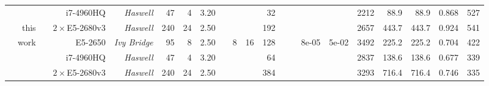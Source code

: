 \begin{table}
\begin{adjustbox}{angle=90}
{{\begin{tabular}{|r|r|r||r|r|r|r|r|r|r|r|r|r|r||r|r|r|r||r|r|r|}
                                                                 &                                 &                       & i7-4960HQ                & \textit{Haswell}                 & 47                   & 4                  & 3.20                   &                          &                     &                     & 32                  &                       &                    &                               &                          &   2212        &   88.9           &   88.9         & 0.868         &    527             \\ \cline{4-8} \cline{12-12} \cline{17-21}
                                                                 & this                            &                       & $2\times$E5-2680v3       & \textit{Haswell}                 & 240                  & 24                 & 2.50                   &                          &                     &                     & 192                 &                       &                    &                               &                          &   2657        &  443.7           &  443.7         & 0.924         &    541             \\ \cline{4-8} \cline{10-12} \cline{15-21}
                                                                 & work                            &                       & E5-2650                  & \textit{Ivy Bridge}              & 95                   & 8                  & 2.50                   &                          & \multirow{3}{*}{8}  & \multirow{3}{*}{16} & 128                 &                       &                    & \multirow{3}{*}{8e-05}        & \multirow{3}{*}{5e-02}   &   3492        &  225.2           &  225.2         & 0.704         &    422             \\ \cline{4-8} \cline{12-12} \cline{17-21}
                                                                 &                                 &                       & i7-4960HQ                & \textit{Haswell}                 & 47                   & 4                  & 3.20                   &                          &                     &                     & 64                  &                       &                    &                               &                          &   2837        &  138.6           &  138.6         & 0.677         &    339             \\ \cline{4-8} \cline{12-12} \cline{17-21}
                                                                 &                                 &                       & $2\times$E5-2680v3       & \textit{Haswell}                 & 240                  & 24                 & 2.50                   &                          &                     &                     & 384                 &                       &                    &                               &                          &   3293        &  716.4           &  716.4         & 0.746         &    335             \\ \cline{2-21}

\end{tabular}}}
\end{adjustbox}
\end{table}
